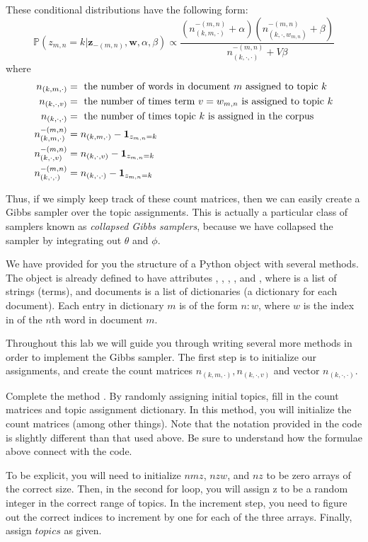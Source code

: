 These conditional distributions have the following form:
\begin{equation*}
\mathbb{P}(z_{m,n} = k | \mathbf{z}_{-(m,n)}, \mathbf{w}, \alpha, \beta) \propto \frac{(n_{(k,m,\cdot)}^{-(m,n)} + \alpha)(n_{(k, \cdot, w_{m,n})}^{-(m,n)} + \beta)}{n_{(k,\cdot,\cdot)}^{-(m,n)} + V \beta}
\end{equation*}
where
\begin{align*}
n_{(k,m,\cdot)} & = \mbox{ the number of words in document $m$ assigned to topic $k$} \\
n_{(k,\cdot,v)} & = \mbox{ the number of times term $v = w_{m,n}$ is assigned to topic $k$} \\
n_{(k,\cdot,\cdot)} & = \mbox{ the number of times topic $k$ is assigned in the corpus} \\
n_{(k,m,\cdot)}^{-(m,n)} & = n_{(k,m,\cdot)} - \boldsymbol{1}_{z_{m,n} = k} \\
n_{(k,\cdot,v)}^{-(m,n)} & = n_{(k,\cdot,v)} - \boldsymbol{1}_{z_{m,n} = k} \\
n_{(k,\cdot,\cdot)}^{-(m,n)} & = n_{(k,\cdot,\cdot)} - \boldsymbol{1}_{z_{m,n} = k}
\end{align*}

Thus, if we simply keep track of these count matrices, then we can easily create a Gibbs sampler over the topic assignments. This is actually a particular class of samplers known as \emph{collapsed Gibbs samplers}, because we have collapsed the sampler by integrating out $\theta$ and $\phi$.

We have provided for you the structure of a Python object  with several methods. The object is already defined to have attributes , , , , and , where  is a list of strings (terms), and documents is a list of dictionaries (a dictionary for each document). Each entry in dictionary $m$ is of the form $n : w$, where $w$ is the index in  of the $n$th word in document $m$.

Throughout this lab we will guide you through writing several more methods in order to implement the Gibbs sampler. The first step is to initialize our assignments, and create the count matrices $n_{(k,m,\cdot)}, n_{(k,\cdot,v)}$ and vector $n_{(k,\cdot,\cdot)}$.

\begin{problem}
Complete the method . By randomly assigning initial topics, fill in the count matrices and topic assignment dictionary. In this method, you will initialize the count matrices (among other things). Note that the notation
provided in the code is slightly different than that used above. Be sure to understand how the formulae above
connect with the code.

To be explicit, you will need to initialize $nmz$, $nzw$, and $nz$ to be zero arrays of the correct size.  Then, in the second for loop, you will assign z to be a random integer in the correct range of topics.  In the increment step, you need to figure out the correct indices to increment by one for each of the three arrays.  Finally, assign $topics$ as given.
\end{problem}

